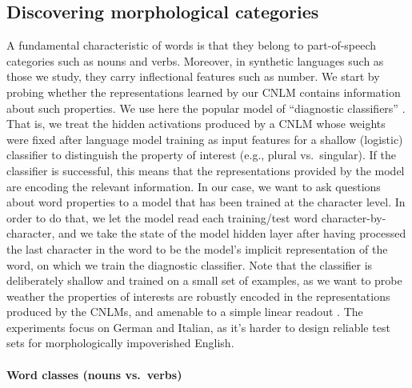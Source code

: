\subsection{Discovering morphological categories}
\label{sec:categories}

A fundamental characteristic of words is that they belong to
part-of-speech categories such as nouns and verbs. Moreover, in
synthetic languages such as those we study, they carry inflectional
features such as number. We start by probing whether the
representations learned by our CNLM contains information about such
properties. We use here the popular model of ``diagnostic
classifiers'' \cite{Hupkes:etal:2017}. That is, we treat the hidden
activations produced by a CNLM whose weights were fixed after language model training as input features for a shallow (logistic)
classifier to distinguish the property of interest (e.g., plural
vs.~singular). If the classifier is successful, this means that the
representations provided by the model are encoding the relevant
information. In our case, we want to ask questions about word
properties to a model that has been trained at the character level. In
order to do that, we let the model read each training/test word
character-by-character, and we take the state of the model hidden
layer after having processed the last character in the word to be the
model's implicit representation of the word, on which we train the
diagnostic classifier. Note that the classifier is deliberately
shallow and trained on a small set of examples, as we want to probe
weather the properties of interests are robustly encoded in the
representations produced by the CNLMs, and amenable to a simple linear
readout \cite{Fusi:etal:2016}. %
The experiments focus on German and Italian, as it's harder to design
reliable test sets for morphologically impoverished English.

\paragraph{Word classes (nouns vs.~verbs)}

